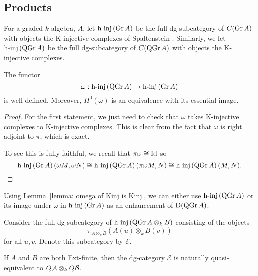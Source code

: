 \documentclass[dissertation.tex]{subfiles}
\begin{document}
\subsection{Products} \label{section: products}

\begin{definition}
  For a graded \(k\)-algebra, \(A\), let \(\operatorname{h-inj}\left(\operatorname{Gr}A\right)\) be the full dg-subcategory of \(C(\operatorname{Gr}A)\) with objects the K-injective complexes of Spaltenstein \cite{Spaltenstein}. Similarly, we let \(\operatorname{h-inj}\left(\operatorname{QGr}A\right)\) be the full dg-subcategory of \(C(\operatorname{QGr}A)\) with objects the K-injective complexes.
\end{definition}

\begin{lemma} \label{lemma: omega of Kinj is Kinj}
  The functor 
  \begin{displaymath}
    \omega : \operatorname{h-inj}\left(\operatorname{QGr}A\right) \to \operatorname{h-inj}\left(\operatorname{Gr}A\right)
  \end{displaymath}
  is well-defined. Moreover, \(H^0(\omega)\) is an equivalence with its essential image. 
\end{lemma}

\begin{proof}
  For the first statement, we just need to check that \(\omega\) takes K-injective complexes to K-injective complexes. 
  This is clear from the fact that \(\omega\) is right adjoint to \(\pi\), which is exact.
  
  To see this is fully faithful, we recall that \(\pi \omega \cong \operatorname{Id}\) so
  \[\operatorname{h-inj}\left(\operatorname{Gr}A\right)(\omega M, \omega N) \cong \operatorname{h-inj}\left(\operatorname{QGr}A\right)(\pi\omega M, N) \cong \operatorname{h-inj}\left(\operatorname{QGr}A\right)(M,N).\]
\end{proof}

\begin{remark} \label{remark: enhancement of DQGr}
  Using Lemma~\ref{lemma: omega of Kinj is Kinj}, we can either use \(\operatorname{h-inj}\left(\operatorname{QGr}A\right)\) or its image under \(\omega\) in \(\operatorname{h-inj}\left(\operatorname{Gr}A\right)\) as an enhancement of \(\mathrm{D}(\operatorname{QGr}A)\). 
\end{remark}

Consider the full dg-subcategory of \(\operatorname{h-inj}\left(\operatorname{QGr}A \otimes_k B\right)\) consisting of the objects
\[\pi_{A \otimes_k B} (A(u) \otimes_k B(v))\]
for all \(u,v\). Denote this subcategory by \(\mathcal E\).

\begin{lemma} \label{lemma: another model for QA otimes QB}
  If \(A\) and \(B\) are both Ext-finite, then the dg-category \(\mathcal E\) is naturally quasi-equivalent to \(Q \mathcal{A} \otimes_k Q \mathcal{B}\).
\end{lemma}
\end{document}
